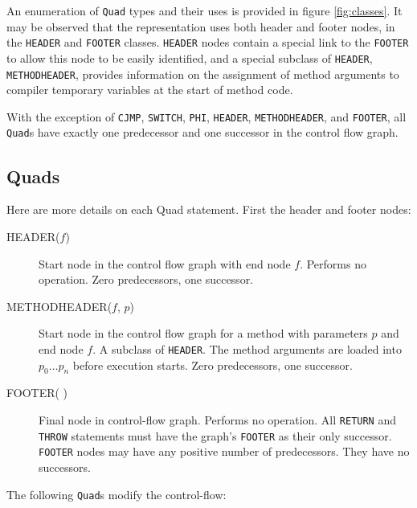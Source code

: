 \documentclass[11pt,notitlepage,twocolumn,twoside]{article}
\begin{document}
An enumeration of
\texttt{Quad} types and their uses is provided in figure
\ref{fig:classes}.  It may be observed that the representation uses both
header and footer nodes, in the \texttt{HEADER} and \texttt{FOOTER}
classes.  \texttt{HEADER} nodes contain a special link to the
\texttt{FOOTER} to allow this node to be easily identified, and a
special subclass of \texttt{HEADER}, \texttt{METHODHEADER}, provides
information on the assignment of method arguments to compiler
temporary variables at the start of method code.

With the exception of \texttt{CJMP}, \texttt{SWITCH}, \texttt{PHI},
\texttt{HEADER}, \texttt{METHODHEADER}, and \texttt{FOOTER}, all
\texttt{Quad}s have exactly one predecessor and one successor in the
control flow graph.

\subsection{Quads}
Here are more details on each Quad statement.  First the header and
footer nodes:
\begin{description}
%
\item[HEADER($f$)] Start node in the control flow graph with end node $f$.
Performs no operation.  Zero predecessors, one successor.
%
\item[METHODHEADER($f$, $p$)] Start node in the control flow graph for
a method with parameters $p$ and end node $f$.  A subclass of \texttt{HEADER}.
The method arguments are loaded into $p_0 \ldots p_n$ before execution starts.
Zero predecessors, one successor.
%
\item[FOOTER( )] Final node in control-flow graph.  Performs no operation.
All \texttt{RETURN} and \texttt{THROW} statements must have the graph's
\texttt{FOOTER} as their only successor.  \texttt{FOOTER} nodes may
have any positive number of predecessors.  They have no successors.
\end{description}
%
The following \texttt{Quad}s modify the control-flow:
\end{document}
